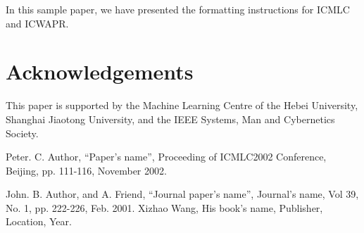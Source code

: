 \documentclass[a4paper, times, 10pt,twocolumn]{article}
\begin{document}
In this sample paper, we have presented the formatting instructions
for ICMLC and ICWAPR.



\section*{Acknowledgements}

This paper is supported by the Machine Learning Centre of the Hebei
University, Shanghai Jiaotong University, and the IEEE Systems, Man
and Cybernetics Society.

%
%

\begin{thebibliography}{99}
Peter. C. Author, ``Paper's name'', Proceeding of ICMLC2002
Conference, Beijing, pp. 111-116, November 2002.

 John. B. Author, and A. Friend, ``Journal paper's name'', Journal's
name, Vol 39, No. 1, pp. 222-226, Feb. 2001.
 Xizhao Wang, His book's name, Publisher, Location, Year.
\end{thebibliography}
\end{document}

